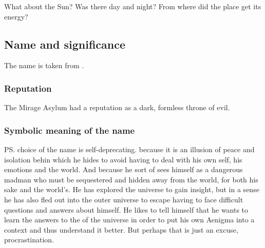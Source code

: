 What about the Sun?
Was there day and night?
From where did the place get its energy?









\subsection{Name and significance}
The name is taken from . 





\subsubsection{Reputation}
The Mirage Asylum had a reputation as a dark, formless throne of evil. 






\subsubsection{Symbolic meaning of the name}
\ps{\Ishnaruchaefir} choice of the name  is self-deprecating. 
 because it is an illusion of peace and isolation behin which he hides to avoid having to deal with his own self, his emotions and the world. 
And  because he sort of sees himself as a dangerous madman who must be sequestered and hidden away from the world, for both his sake and the world's. 
He has explored the universe to gain insight, but in a sense he has also fled out into the outer universe to escape having to face difficult questions and answers about himself. 
He likes to tell himself that he wants to learn the answers to the  of the universe in order to put his own Aenigma into a context and thus understand it better. 
But perhaps that is just an excuse, procrastination. 









